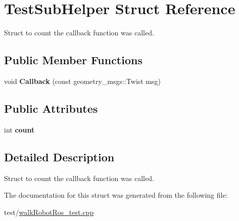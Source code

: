 \hypertarget{structTestSubHelper}{}\section{Test\+Sub\+Helper Struct Reference}
\label{structTestSubHelper}


Struct to count the callback function was called.  


\subsection*{Public Member Functions}
\begin{DoxyCompactItemize}
\item 
void {\bfseries Callback} (const geometry\+\_\+msgs\+::\+Twist msg)\hypertarget{structTestSubHelper_a77137ca8fc4e9a4282dc19d0cf19492b}{}\label{structTestSubHelper_a77137ca8fc4e9a4282dc19d0cf19492b}

\end{DoxyCompactItemize}
\subsection*{Public Attributes}
\begin{DoxyCompactItemize}
\item 
int {\bfseries count}\hypertarget{structTestSubHelper_a19fb53c9cc2ee67ddaf6f272e72dd2bb}{}\label{structTestSubHelper_a19fb53c9cc2ee67ddaf6f272e72dd2bb}

\end{DoxyCompactItemize}


\subsection{Detailed Description}
Struct to count the callback function was called. 

The documentation for this struct was generated from the following file\+:\begin{DoxyCompactItemize}
\item 
test/\hyperlink{walkRobotRos__test_8cpp}{walk\+Robot\+Ros\+\_\+test.\+cpp}\end{DoxyCompactItemize}

